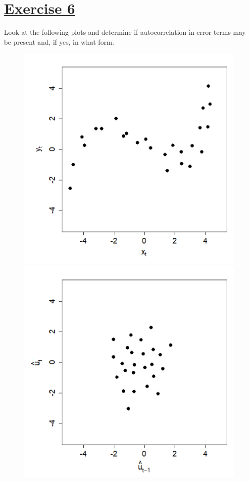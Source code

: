 \documentclass[captions=tableheading, 12pt, headings=small, parskip=half]{scrartcl}
\begin{document}
\section*{\underline{Exercise 6}}
Look at the following plots and determine if autocorrelation in error terms may be present and, if yes, in what form.
\begin{figure}[H]
	\begin{minipage}{0.48\columnwidth}
		\includegraphics[width = \columnwidth]{Code2/autoco1.png}
	\end{minipage}
\hfill
	\begin{minipage}{0.48\columnwidth}
	\includegraphics[width = \columnwidth]{Code2/autoco2.png}
	\end{minipage}
\end{figure}
\end{document}
